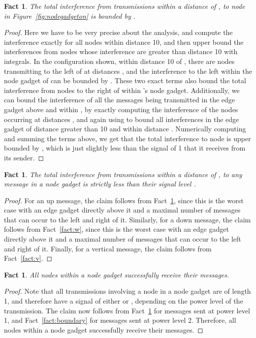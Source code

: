 \documentclass{article}
\newtheorem{fact}[lemma]{Fact}
\begin{document}
\begin{fact}\label{fact:u}
The total interference from transmissions within a distance of , to node  in Figure~\ref{fig:nodegadgeton} is bounded by .
\end{fact}
\begin{proof}
Here we have to be very precise about the analysis, and compute the interference exactly for all nodes within distance 10, and then upper bound the interferences from nodes whose interference are greater than distance 10 with integrals.  In the configuration shown, within distance 10 of , there are nodes transmitting to the left of  at distances , and the interference to the left within the node gadget of  can be bounded by .  These two exact terms also bound the total interference from nodes to the right of  within 's node gadget.  Additionally, we can bound the interference of all the messages being transmitted in the edge gadget above  and within , by exactly computing the interference of the nodes occurring at distances , and again using  to bound all interferences in the edge gadget of distance greater than 10 and within distance .  Numerically computing and summing the terms above, we get that the total interference to node  is upper bounded by , which is just slightly less than the signal of 1 that it receives from its sender.
\end{proof}

\begin{fact}\label{fact:allnode}
The total interference from transmissions within a distance of , to any message in a node gadget is strictly less than their signal level .
\end{fact}
\begin{proof}
For an up message, the claim follows from Fact~\ref{fact:u}, since this is the worst case with an edge gadget directly above it and a maximal number of messages that can occur to the left and right of it. Similarly, for a down message, the claim follows from Fact~\ref{fact:w}, since this is the worst case with an edge gadget directly above it and a maximal number of messages that can occur to the left and right of it. Finally, for a vertical message, the claim follows from Fact~\ref{fact:v}.
\end{proof}

\begin{fact}
All nodes within a node gadget successfully receive their messages.
\end{fact}
\begin{proof}
Note that all transmissions involving a node in a node gadget are of length 1, and therefore have a signal of either  or , depending on the power level of the transmission.
The claim now follows from Fact~\ref{fact:allnode} for messages sent at power level 1, and Fact~\ref{fact:boundary} for messages sent at power level 2. Therefore, all nodes within a node gadget successfully receive their messages.
\end{proof}
\end{document}
